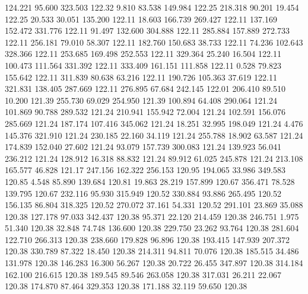  124.221   95.600  323.503       122.32
   9.810   83.538  149.984       122.25
 218.318   90.201   19.454       122.25
  20.533   30.051  135.200       122.11
  18.603  166.739  269.427       122.11
 137.169  152.472  331.776       122.11
  91.497  132.600  304.888       122.11
 285.884  157.889  272.733       122.11
 256.181   79.010   58.307       122.11
 182.760  150.683   38.733       122.11
  74.236  102.643  328.366       122.11
 253.685  169.498  252.553       122.11
 329.364   25.240   16.504       122.11
 100.473  111.564  331.392       122.11
 333.409  161.151  111.858       122.11
   0.528   79.823  155.642       122.11
 311.839   80.638   63.216       122.11
 190.726  105.363   37.619       122.11
 321.831  138.405  287.669       122.11
 276.895   67.684  242.145       122.01
 206.410   89.510   10.200       121.39
 255.730   69.029  254.950       121.39
 100.894   64.408  290.064       121.24
 101.869   90.788  289.532       121.24
 210.941  155.942   72.004       121.24
 102.591  156.076  285.669       121.24
 187.174  107.416  345.062       121.24
  18.251   32.995  198.049       121.24
   4.476  145.376  321.910       121.24
 230.185   22.160   34.119       121.24
 255.788   18.902   63.587       121.24
 174.839  152.040   27.602       121.24
  93.079  157.739  300.083       121.24
 139.923   56.041  236.212       121.24
 128.912   16.318   88.832       121.24
  89.912   61.025  245.878       121.24
 213.108  165.577   46.828       121.17
 247.156  162.322  256.153       120.95
 194.065   33.986  349.583       120.85
   4.548   85.890  139.684       120.81
  19.863   28.219  157.899       120.67
 356.471   78.528  139.795       120.67
 232.116   95.930  315.949       120.52
 330.884   93.886  265.495       120.52
 156.135   86.804  318.325       120.52
 270.072   37.161   54.331       120.52
 291.101   23.869   35.088       120.38
 127.178   97.033  342.437       120.38
  95.371   22.120  214.459       120.38
 246.751    1.975   51.340       120.38
  32.848   74.748  136.600       120.38
 229.750   23.262   93.764       120.38
 281.604  122.710  266.313       120.38
 238.660  179.828   96.896       120.38
 193.415  147.939  207.372       120.38
 330.789   87.322   18.450       120.38
 214.311   94.811   70.076       120.38
 185.515   34.486  131.978       120.38
 146.283   16.300   56.267       120.38
  20.722   26.455  347.897       120.38
 314.184  162.100  216.615       120.38
 189.545   89.546  263.058       120.38
 317.031   26.211   22.067       120.38
 174.870   87.464  329.353       120.38
 171.188   32.119   59.650       120.38
